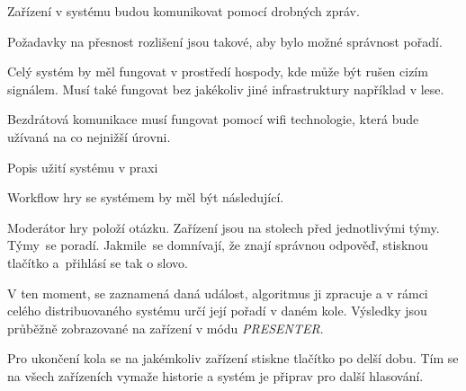 Zařízení v systému budou komunikovat pomocí drobných zpráv.

Požadavky na přesnost rozlišení jsou takové, aby bylo možné správnost pořadí.

Celý systém by měl fungovat v prostředí hospody, kde může být rušen cizím signálem. Musí také fungovat bez jakékoliv jiné infrastruktury například v lese.

Bezdrátová komunikace musí fungovat pomocí wifi technologie, která bude užívaná na co nejnižší úrovni.

\sec Popis užití systému v praxi

Workflow hry se systémem by měl být následující.

Moderátor hry položí otázku. Zařízení jsou na stolech před jednotlivými týmy. Týmy~se poradí. Jakmile~se domnívají, že znají správnou odpověď, stisknou tlačítko a~přihlásí se tak o slovo.

V ten moment, se zaznamená daná událost, algoritmus ji zpracuje a v rámci celého distribuovaného systému určí její pořadí v daném kole. Výsledky jsou průběžně zobrazované na zařízení v módu {\em PRESENTER}.

Pro ukončení kola se na jakémkoliv zařízení stiskne tlačítko po delší dobu. Tím se na všech zařízeních vymaže historie a systém je připrav pro další hlasování.
